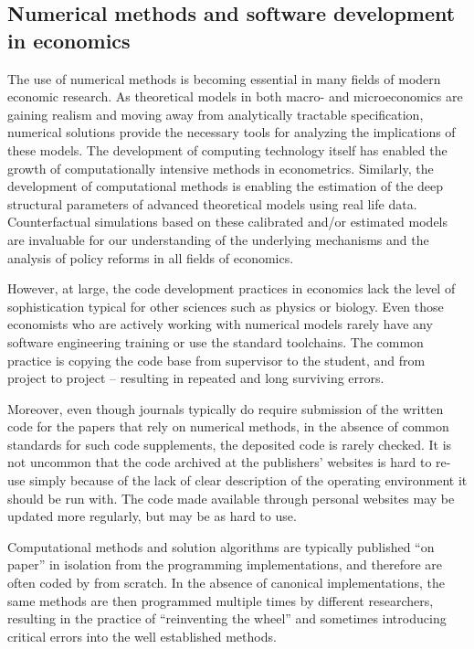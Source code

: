 
\subsection{Numerical methods and software development in economics}

The use of numerical methods is becoming essential in many fields of modern economic research.
As theoretical models in both macro- and microeconomics are gaining realism and moving away from
analytically tractable specification, numerical solutions provide the necessary tools for 
analyzing the implications of these models.
The development of computing technology itself has enabled the growth of computationally intensive
methods in econometrics.
Similarly, the development of computational methods is enabling the estimation of the deep 
structural parameters of advanced theoretical models using real life data.
Counterfactual simulations based on these calibrated and/or estimated models are 
invaluable for our understanding of the underlying mechanisms and the analysis of 
policy reforms in all fields of economics.

However, at large, the code development practices in economics lack the level of 
sophistication typical for other sciences such as physics or biology.
Even those economists who are actively working with numerical models rarely have 
any software engineering training or use the standard toolchains.
The common practice is copying the code base from supervisor to the student, and from
project to project -- resulting in repeated and long surviving errors.

Moreover, even though journals typically do require submission of the written code for the 
papers that rely on numerical methods, in the absence of common standards for such 
code supplements, the deposited code is rarely checked.  It is not uncommon that the
code archived at the publishers' websites is hard to re-use simply because of the lack
of clear description of the operating environment it should be run with.
The code made available through personal websites may be updated more regularly, 
but may be as hard to use.

Computational methods and solution algorithms are typically
published ``on paper'' in isolation from the programming implementations, and therefore
are often coded by from scratch.
In the absence of canonical implementations, the same methods are then programmed multiple 
times by different researchers, 
resulting in the practice of ``reinventing the wheel'' and sometimes introducing 
critical errors into the well established methods.

